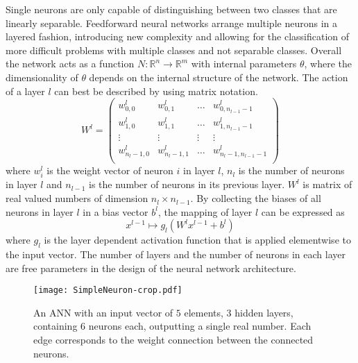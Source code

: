 %
Single neurons are only capable of distinguishing between two classes that are linearly separable. Feedforward neural networks arrange multiple neurons in a layered fashion, introducing new complexity and allowing for the classification of more difficult problems with multiple classes and not separable classes. Overall the network acts as a function $N: \mathbb{R}^n \rightarrow \mathbb{R}^m$ with internal parameters $\theta$, where the dimensionality of $\theta$ depends on the internal structure of the network. The action of a layer $l$ can best be described by using matrix notation. 
\begin{equation}
W^l = 
\begin{pmatrix}
w_{0,0}^l & w_{0,1}^l & \dots & w_{0,n_{l-1}-1}^l \\
w_{1,0}^l & w_{1,1}^l & \dots & w_{1,n_{l-1}-1}^l \\
\vdots & \vdots & \vdots & \vdots \\
w_{n_l-1,0}^l & w_{n_l-1,1}^l & \dots & w_{n_l-1,n_{l-1}-1}^l \\
\end{pmatrix}
\end{equation}
where $w_i^l$ is the weight vector of neuron $i$ in layer $l$, $n_l$ is the number of neurons in layer $l$ and $n_{l-1}$ is the number of neurons in its previous layer. $W^l$ is matrix of real valued numbers of dimension $n_l \times n_{l-1}$. By collecting the biases of all neurons in layer $l$ in a bias vector $b^l$, the mapping of layer $l$ can be expressed as%
\begin{equation}
x^{l-1} \mapsto g_l(W^l x^{l-1} + b^l)
\end{equation}
where $g_l$ is the layer dependent activation function that is applied elementwise to the input vector. The number of layers and the number of neurons in each layer are free parameters in the design of the neural network architecture. \\
\begin{figure}[H]
\centering
  \texttt{[image: SimpleNeuron-crop.pdf]}
  \caption{An ANN with an input vector of $5$ elements, $3$ hidden layers, containing $6$ neurons each, outputting a single real number. Each edge corresponds to the weight connection between the connected neurons. }
  \label{fig:ANN}
\end{figure}

